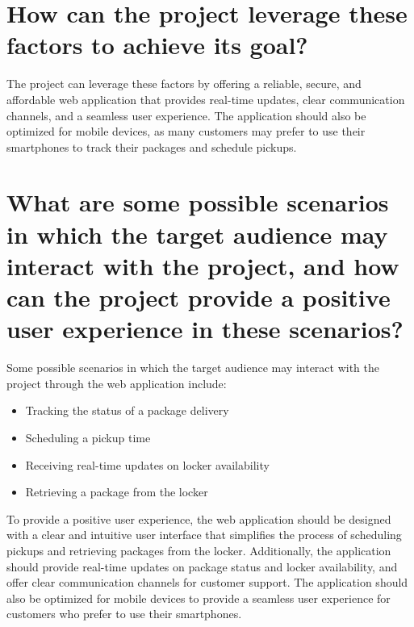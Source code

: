 \documentclass{article}
\begin{document}
\section{How can the project leverage these factors to achieve its goal?}
The project can leverage these factors by offering a reliable, secure, and affordable web application that provides real-time updates, clear communication channels, and a seamless user experience. The application should also be optimized for mobile devices, as many customers may prefer to use their smartphones to track their packages and schedule pickups.

\section{What are some possible scenarios in which the target audience may interact with the project, and how can the project provide a positive user experience in these scenarios?}
Some possible scenarios in which the target audience may interact with the project through the web application include:

\begin{itemize}
    \item Tracking the status of a package delivery
    \item Scheduling a pickup time
    \item Receiving real-time updates on locker availability
    \item Retrieving a package from the locker
\end{itemize}

To provide a positive user experience, the web application should be designed with a clear and intuitive user interface that simplifies the process of scheduling pickups and retrieving packages from the locker. Additionally, the application should provide real-time updates on package status and locker availability, and offer clear communication channels for customer support. The application should also be optimized for mobile devices to provide a seamless user experience for customers who prefer to use their smartphones.
\end{document}
